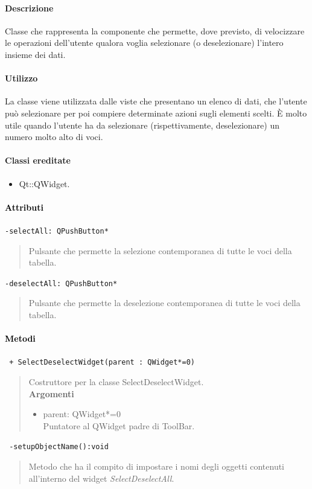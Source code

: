 \paragraph{Descrizione \\}
Classe che rappresenta la componente che permette, dove previsto, di velocizzare le operazioni dell'utente qualora voglia selezionare (o deselezionare) l'intero insieme dei dati.
\paragraph{Utilizzo\\}
La classe viene utilizzata dalle viste che presentano un elenco di dati, che l'utente può selezionare per poi compiere determinate azioni sugli elementi scelti. È molto utile quando l'utente ha da selezionare (rispettivamente, deselezionare) un numero molto alto di voci.
\paragraph{Classi ereditate\\}
\begin{itemize}
\item Qt::QWidget.
\end{itemize}
\paragraph{\textcolor{black}{Attributi\\}}
\color{teal}\verb!-selectAll: QPushButton*!
\begin{quote}
\color{black}Pulsante che permette la selezione contemporanea di tutte le voci della tabella.
\end{quote}
\color{teal}\verb!-deselectAll: QPushButton*!
\begin{quote}
\color{black}Pulsante che permette la deselezione contemporanea di tutte le voci della tabella.
\end{quote}
\paragraph{\textcolor{black}{Metodi\\}}
\color{blue}\verb! + SelectDeselectWidget(parent : QWidget*=0)!
\begin{quote}
\color{black}Costruttore per la classe SelectDeselectWidget. \\
\textbf{Argomenti}
\begin{itemize}
\item parent: QWidget*=0  \\ Puntatore al QWidget padre di ToolBar.
\end{itemize}
\end{quote}
\color{blue}\verb! -setupObjectName():void!
\color{black}
\begin{quote}Metodo che ha il compito di impostare i nomi degli oggetti contenuti all'interno del widget \emph{SelectDeselectAll}.
\end{quote} 
\color{black}
\pagebreak
